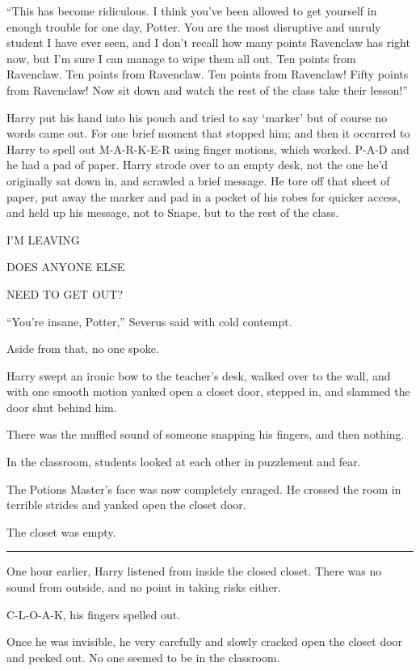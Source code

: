 ``This has become ridiculous. I think you've been allowed to get yourself in enough trouble for one day, Potter. You are the most disruptive and unruly student I have ever seen, and I don't recall how many points Ravenclaw has right now, but I'm sure I can manage to wipe them all out. Ten points from Ravenclaw. Ten points from Ravenclaw. Ten points from Ravenclaw! Fifty points from Ravenclaw! Now sit down and watch the rest of the class take their lesson!''

Harry put his hand into his pouch and tried to say `marker' but of course no words came out. For one brief moment that stopped him; and then it occurred to Harry to spell out M-A-R-K-E-R using finger motions, which worked. P-A-D and he had a pad of paper. Harry strode over to an empty desk, not the one he'd originally sat down in, and scrawled a brief message. He tore off that sheet of paper, put away the marker and pad in a pocket of his robes for quicker access, and held up his message, not to Snape, but to the rest of the class.

I'M LEAVING

DOES ANYONE ELSE

NEED TO GET OUT?

``You're insane, Potter,'' Severus said with cold contempt.

Aside from that, no one spoke.

Harry swept an ironic bow to the teacher's desk, walked over to the wall, and with one smooth motion yanked open a closet door, stepped in, and slammed the door shut behind him.

There was the muffled sound of someone snapping his fingers, and then nothing.

In the classroom, students looked at each other in puzzlement and fear.

The Potions Master's face was now completely enraged. He crossed the room in terrible strides and yanked open the closet door.

The closet was empty.

\begin{center}\rule{3in}{0.4pt}\end{center}

One hour earlier, Harry listened from inside the closed closet. There was no sound from outside, and no point in taking risks either.

C-L-O-A-K, his fingers spelled out.

Once he was invisible, he very carefully and slowly cracked open the closet door and peeked out. No one seemed to be in the classroom.

